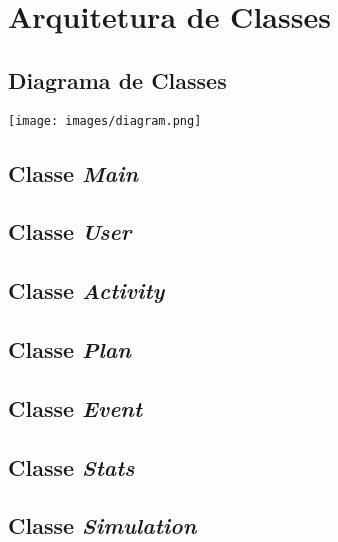 \documentclass[a4paper,12pt]{scrreprt}
\begin{document}
\pagebreak

%
%
%




\chapter{Arquitetura de Classes}
\section{Diagrama de Classes}
\begin{center}
    \texttt{[image: images/diagram.png]}
\end{center}

\section{Classe \textit{Main}}
\section{Classe \textit{User}}
\section{Classe \textit{Activity}}
\section{Classe \textit{Plan}}
\section{Classe \textit{Event}}
\section{Classe \textit{Stats}}
\section{Classe \textit{Simulation}}
\end{document}
